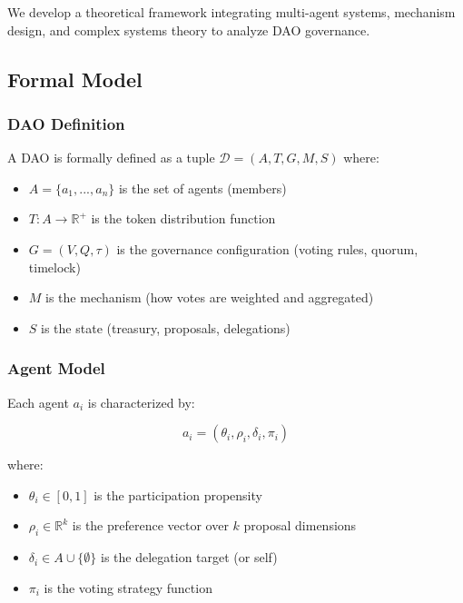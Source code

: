 
We develop a theoretical framework integrating multi-agent systems, mechanism design, and complex systems theory to analyze DAO governance.

\subsection{Formal Model}

\subsubsection{DAO Definition}

A DAO is formally defined as a tuple $\mathcal{D} = (A, T, G, M, S)$ where:

\begin{itemize}
    \item $A = \{a_1, ..., a_n\}$ is the set of agents (members)
    \item $T: A \rightarrow \mathbb{R}^+$ is the token distribution function
    \item $G = (V, Q, \tau)$ is the governance configuration (voting rules, quorum, timelock)
    \item $M$ is the mechanism (how votes are weighted and aggregated)
    \item $S$ is the state (treasury, proposals, delegations)
\end{itemize}

\subsubsection{Agent Model}

Each agent $a_i$ is characterized by:

\begin{equation}
a_i = (\theta_i, \rho_i, \delta_i, \pi_i)
\end{equation}

where:
\begin{itemize}
    \item $\theta_i \in [0, 1]$ is the participation propensity
    \item $\rho_i \in \mathbb{R}^k$ is the preference vector over $k$ proposal dimensions
    \item $\delta_i \in A \cup \{\emptyset\}$ is the delegation target (or self)
    \item $\pi_i$ is the voting strategy function
\end{itemize}

